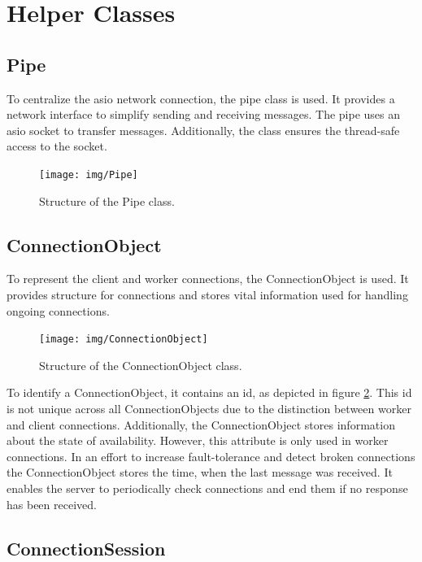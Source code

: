 \documentclass[12pt, letterpaper]{article}
\begin{document}
\section{Helper Classes}

\subsection{Pipe}

To centralize the asio network connection, the pipe class is used. It provides a network interface to simplify sending and receiving messages. The pipe uses an asio socket to transfer messages. Additionally, the class ensures the thread-safe access to the socket. 

\begin{figure}[h]
	\centering
	\texttt{[image: img/Pipe]}
	\caption{Structure of the Pipe class.}
	\label{fig:classes_Pipe}
\end{figure}

\subsection{ConnectionObject}

To represent the client and worker connections, the ConnectionObject is used. It provides structure for connections and stores vital information used for handling ongoing connections. 

\begin{figure}[h]
	\centering
	\texttt{[image: img/ConnectionObject]}
	\caption{Structure of the ConnectionObject class.}
	\label{fig:classes_ConnectionObject}
\end{figure}

To identify a ConnectionObject, it contains an id, as depicted in figure \ref{fig:classes_ConnectionObject}. This id is not unique across all ConnectionObjects due to the distinction between worker and client connections. Additionally, the ConnectionObject stores information about the state of availability. However, this attribute is only used in worker connections.\newline
In an effort to increase fault-tolerance and detect broken connections the ConnectionObject stores the time, when the last message was received. It enables the server to periodically check connections and end them if no response has been received.

\subsection{ConnectionSession}
\end{document}
